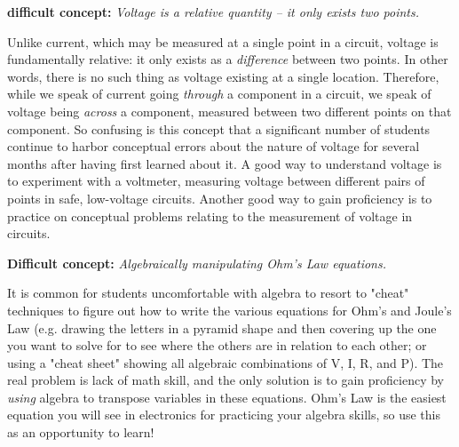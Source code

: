 \vskip 10pt

\noindent
{\bf {} difficult concept: } {\it Voltage is a relative quantity -- it only exists  two points.}

Unlike current, which may be measured at a single point in a circuit, voltage is fundamentally relative: it only exists as a {\it difference} between two points.  In other words, there is no such thing as voltage existing at a single location.  Therefore, while we speak of current going {\it through} a component in a circuit, we speak of voltage being {\it across} a component, measured between two different points on that component.  So confusing is this concept that a significant number of students continue to harbor conceptual errors about the nature of voltage for several months after having first learned about it.  A good way to understand voltage is to experiment with a voltmeter, measuring voltage between different pairs of points in safe, low-voltage circuits.  Another good way to gain proficiency is to practice on conceptual problems relating to the measurement of voltage in circuits.

\vskip 10pt

\noindent
{\bf Difficult concept: } {\it Algebraically manipulating Ohm's Law equations.}

It is common for students uncomfortable with algebra to resort to "cheat" techniques to figure out how to write the various equations for Ohm's and Joule's Law (e.g. drawing the letters in a pyramid shape and then covering up the one you want to solve for to see where the others are in relation to each other; or using a "cheat sheet" showing all algebraic combinations of V, I, R, and P).  The real problem is lack of math skill, and the only solution is to gain proficiency by {\it using} algebra to transpose variables in these equations.  Ohm's Law is the easiest equation you will see in electronics for practicing your algebra skills, so use this as an opportunity to learn!


